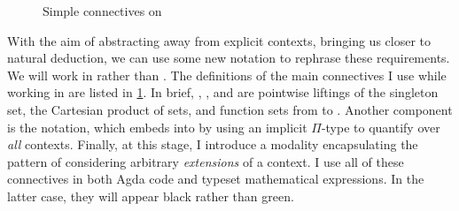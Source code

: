 \begin{figure}
  \begin{minipage}[t]{0.333\textwidth}
  \end{minipage}
  \begin{minipage}[t]{0.666\textwidth}
  \end{minipage}
  \begin{minipage}[t]{0.549\textwidth}
  \end{minipage}
  \begin{minipage}[t]{0.450\textwidth}
  \end{minipage}
  \begin{minipage}[t]{0.450\textwidth}
  \end{minipage}
  \begin{minipage}[t]{0.549\textwidth}
  \end{minipage}
  \caption{Simple connectives on \AgdaSpace{}\AgdaSymbol{$\to$}%
    \AgdaSpace{}}
  \label{fig:simple-connectives}
\end{figure}

With the aim of abstracting away from explicit contexts, bringing us closer to
natural deduction, we can use some new notation to rephrase these requirements.
We will work in \AgdaSpace{}\AgdaSymbol{$\to$}\AgdaSpace{}%
 rather than .
The definitions of the main connectives I use while working in
\AgdaSpace{}\AgdaSymbol{$\to$}\AgdaSpace{}
are listed in \cref{fig:simple-connectives}.
In brief, , \AgdaFunction{\_$\dottimes$\_}, and
\AgdaFunction{\_$\dotto$\_} are pointwise liftings of the singleton set, the
Cartesian product of sets, and function sets from  to
\AgdaSpace{}\AgdaSymbol{$\to$}\AgdaSpace{}.
Another component is the \AgdaFunction{$\forall[\_]$} notation, which
embeds \AgdaSpace{}\AgdaSymbol{$\to$}\AgdaSpace{}%
 into  by using an implicit $\Pi$-type
to quantify over \emph{all} contexts.
Finally, at this stage, I introduce a modality \AgdaFunction{$\bigcirc$}
encapsulating the pattern of considering arbitrary \emph{extensions} of a
context.
I use all of these connectives in both Agda code and typeset mathematical
expressions.
In the latter case, they will appear black rather than green.

